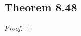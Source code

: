 \documentclass[../../main.tex]{subfiles}
\begin{document}
\subsection{Theorem 8.48}
\begin{wts}

\end{wts}
\begin{proof}

\end{proof}
\end{document}
